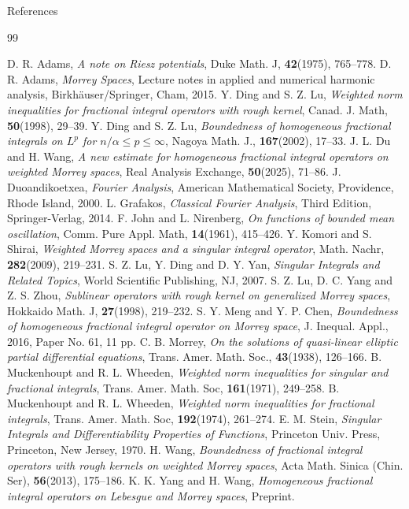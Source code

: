 \documentclass[preprint,10pt]{elsarticle}
\numberwithin{equation}{section}
\begin{document}


\begin{center}
References
\end{center}

\begin{thebibliography}{99}

D. R. Adams, \emph{A note on Riesz potentials}, Duke Math. J, \textbf{42}(1975), 765--778.
D. R. Adams, \emph{Morrey Spaces}, Lecture notes in applied and numerical harmonic analysis, Birkh\"{a}user/Springer, Cham, 2015.
Y. Ding and S. Z. Lu, \emph{Weighted norm inequalities for fractional integral operators with rough kernel}, Canad. J. Math, \textbf{50}(1998), 29--39.
Y. Ding and S. Z. Lu, \emph{Boundedness of homogeneous fractional integrals on $L^p$ for $n/{\alpha}\leq p\leq\infty$}, Nagoya Math. J., \textbf{167}(2002), 17--33.
J. L. Du and H. Wang, \emph{A new estimate for homogeneous fractional integral operators on weighted Morrey spaces}, Real Analysis Exchange, \textbf{50}(2025), 71--86.
J. Duoandikoetxea, \emph{Fourier Analysis}, American Mathematical Society, Providence, Rhode Island, 2000.
L. Grafakos, \emph{Classical Fourier Analysis}, Third Edition, Springer-Verlag, 2014.
F. John and L. Nirenberg, \emph{On functions of bounded mean oscillation}, Comm. Pure Appl. Math, \textbf{14}(1961), 415--426.
Y. Komori and S. Shirai, \emph{Weighted Morrey spaces and a singular integral operator}, Math. Nachr, \textbf{282}(2009), 219--231.
S. Z. Lu, Y. Ding and D. Y. Yan, \emph{Singular Integrals and Related Topics}, World Scientific Publishing, NJ, 2007.
S. Z. Lu, D. C. Yang and Z. S. Zhou, \emph{Sublinear operators with rough kernel on generalized Morrey spaces}, Hokkaido Math. J, \textbf{27}(1998), 219--232.
S. Y. Meng and Y. P. Chen, \emph{Boundedness of homogeneous fractional integral operator on Morrey space}, J. Inequal. Appl., 2016, Paper No. 61, 11 pp.
C. B. Morrey, \emph{On the solutions of quasi-linear elliptic partial differential equations}, Trans. Amer. Math. Soc., \textbf{43}(1938), 126--166.
B. Muckenhoupt and R. L. Wheeden, \emph{Weighted norm inequalities for singular and fractional integrals}, Trans. Amer. Math. Soc, \textbf{161}(1971), 249--258.
B. Muckenhoupt and R. L. Wheeden, \emph{Weighted norm inequalities for fractional integrals}, Trans. Amer. Math. Soc, \textbf{192}(1974), 261--274.
E. M. Stein, \emph{Singular Integrals and Differentiability Properties of Functions}, Princeton Univ. Press, Princeton, New Jersey, 1970.
H. Wang, \emph{Boundedness of fractional integral operators with rough kernels on weighted Morrey spaces}, Acta Math. Sinica (Chin. Ser),  \textbf{56}(2013), 175--186.
K. K. Yang and H. Wang, \emph{Homogeneous fractional integral operators on Lebesgue and Morrey spaces}, Preprint.

\end{thebibliography}
\end{document}

